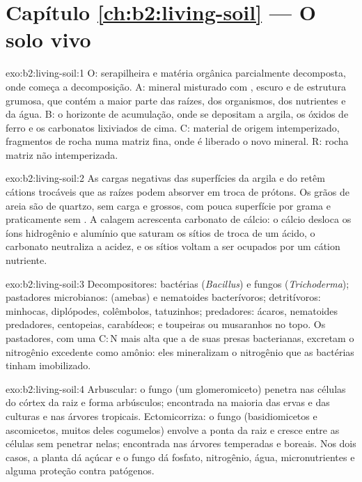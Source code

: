 \section*{Capítulo \ref{ch:b2:living-soil} --- O solo vivo}

\begin{solution}{exo:b2:living-soil:1}
O: serapilheira e matéria orgânica parcialmente decomposta, onde começa a
decomposição. A:  mineral misturado com , escuro e de estrutura
grumosa, que contém a maior parte das raízes, dos organismos, dos
nutrientes e da água. B: o horizonte de acumulação, onde se depositam a
argila, os óxidos de ferro e os carbonatos lixiviados de cima. C:
material de origem intemperizado, fragmentos de rocha numa matriz fina,
onde é liberado o novo  mineral. R: rocha matriz não intemperizada.
\end{solution}

\begin{solution}{exo:b2:living-soil:2}
As cargas negativas das superfícies da argila e do  retêm cátions
trocáveis que as raízes podem absorver em troca de prótons. Os grãos de
areia são de quartzo, sem carga e grossos, com pouca superfície por
grama e praticamente sem . A calagem acrescenta carbonato de
cálcio: o cálcio desloca os íons hidrogênio e alumínio que saturam os
sítios de troca de um  ácido, o carbonato neutraliza a acidez, e os
sítios voltam a ser ocupados por um cátion nutriente.
\end{solution}

\begin{solution}{exo:b2:living-soil:3}
Decompositores: bactérias (\emph{Bacillus}) e fungos
(\emph{Trichoderma}); pastadores microbianos:  (amebas) e
nematoides bacterívoros; detritívoros: minhocas, diplópodes, colêmbolos,
tatuzinhos; predadores: ácaros, nematoides predadores, centopeias,
carabídeos; e toupeiras ou musaranhos no topo. Os pastadores, com uma
$\mathrm{C:N}$ mais alta que a de suas presas bacterianas,
excretam o nitrogênio excedente como amônio: eles mineralizam o
nitrogênio que as bactérias tinham imobilizado.
\end{solution}

\begin{solution}{exo:b2:living-soil:4}
Arbuscular: o fungo (um glomeromiceto) penetra nas células do córtex da
raiz e forma arbúsculos; encontrada na maioria das ervas e das culturas
e nas árvores tropicais. Ectomicorriza: o fungo (basidiomicetos e
ascomicetos, muitos deles cogumelos) envolve a ponta da raiz e cresce
entre as células sem penetrar nelas; encontrada nas árvores temperadas e
boreais. Nos dois casos, a planta dá açúcar e o fungo dá fosfato,
nitrogênio, água, micronutrientes e alguma proteção contra patógenos.
\end{solution}

